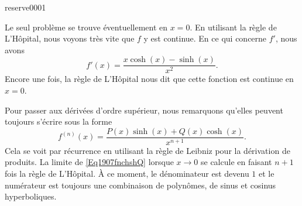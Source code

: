 

\begin{corrige}{reserve0001}

	Le seul problème se trouve éventuellement en $x=0$. En utilisant la règle de L'Hôpital, nous voyons très vite que $f$ y est continue. En ce qui concerne $f'$, nous avons
	\begin{equation}
		f'(x)=\frac{ x\cosh(x)-\sinh(x) }{ x^2 }.
	\end{equation}
	Encore une fois, la règle de L'Hôpital nous dit que cette fonction est continue en $x=0$.

	Pour passer aux dérivées d'ordre supérieur, nous remarquons qu'elles peuvent toujours s'écrire sous la forme
	\begin{equation}	\label{Eq1907fnchshQ}
		f^{(n)}(x)=\frac{ P(x)\sinh(x)+Q(x)\cosh(x) }{ x^{n+1} }.
	\end{equation}
	Cela se voit par récurrence en utilisant la règle de Leibniz pour la dérivation de produits. La limite de \eqref{Eq1907fnchshQ} lorsque $x\to 0$ se calcule en faisant $n+1$ fois la règle de L'Hôpital. À ce moment, le dénominateur est devenu $1$ et le numérateur est toujours une combinaison de polynômes, de sinus et cosinus hyperboliques.

\end{corrige}
